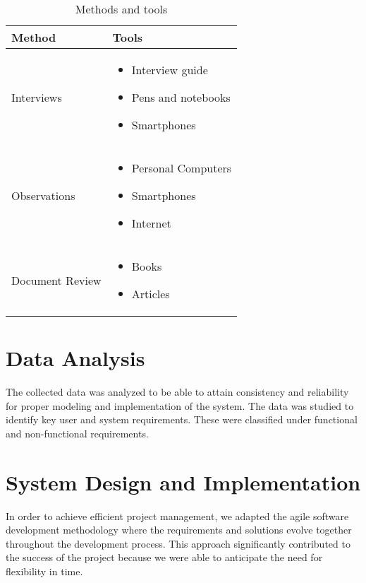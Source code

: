 \begin{table}
\caption{Methods and tools}
\begin{tabular}{|p{4cm}|p{10cm}|}
\hline
\textbf{Method}&\textbf{Tools}\\
\hline
\hline
Interviews & \begin{itemize}
\item Interview guide
\item Pens and notebooks
\item Smartphones
\end{itemize}\\ 
\hline

Observations & \begin{itemize}
\item Personal Computers
\item Smartphones
\item Internet
\end{itemize}\\
\hline
Document Review & \begin{itemize}
\item Books
\item Articles
\end{itemize}\\

\hline

\end{tabular}
\end{table}


\section{Data Analysis}
The collected data was analyzed to be able to attain consistency and reliability for proper modeling and implementation of the system. The data was studied to identify key user and system requirements. These were classified under functional and non-functional requirements.

\section{System Design and Implementation}
In order to achieve efficient project management, we adapted the agile software development methodology where the requirements and solutions evolve together throughout the development process. This approach significantly contributed to the success of the project because we were able to anticipate the need for flexibility in time.

